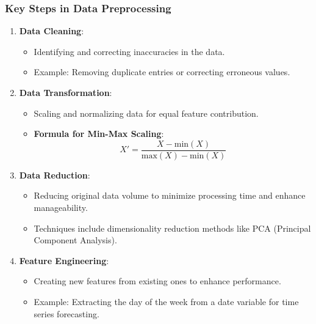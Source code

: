 \documentclass[aspectratio=169]{beamer}
\begin{document}
\begin{frame}[fragile]
    \frametitle{Key Steps in Data Preprocessing}
    \begin{enumerate}
        \item \textbf{Data Cleaning}:
        \begin{itemize}
            \item Identifying and correcting inaccuracies in the data.
            \item Example: Removing duplicate entries or correcting erroneous values.
        \end{itemize}
        
        \item \textbf{Data Transformation}:
        \begin{itemize}
            \item Scaling and normalizing data for equal feature contribution.
            \item \textbf{Formula for Min-Max Scaling}:
            \[
            X' = \frac{X - \text{min}(X)}{\text{max}(X) - \text{min}(X)}
            \]
        \end{itemize}

        \item \textbf{Data Reduction}:
        \begin{itemize}
            \item Reducing original data volume to minimize processing time and enhance manageability.
            \item Techniques include dimensionality reduction methods like PCA (Principal Component Analysis).
        \end{itemize}
        
        \item \textbf{Feature Engineering}:
        \begin{itemize}
            \item Creating new features from existing ones to enhance performance.
            \item Example: Extracting the day of the week from a date variable for time series forecasting.
        \end{itemize}
    \end{enumerate}
\end{frame}
\end{document}
